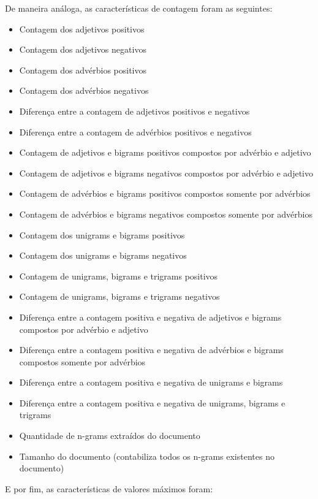 De maneira análoga, as características de contagem foram as seguintes:

\begin{itemize}
\item Contagem dos adjetivos positivos
\item Contagem dos adjetivos negativos
\item Contagem dos advérbios positivos
\item Contagem dos advérbios negativos
\item Diferença entre a contagem de adjetivos positivos e negativos
\item Diferença entre a contagem de advérbios positivos e negativos
\item Contagem de adjetivos e bigrams positivos compostos por advérbio e adjetivo
\item Contagem de adjetivos e bigrams negativos compostos por advérbio e adjetivo
\item Contagem de advérbios e bigrams positivos compostos somente por advérbios
\item Contagem de advérbios e bigrams negativos compostos somente por advérbios
\item Contagem dos unigrams e bigrams positivos
\item Contagem dos unigrams e bigrams negativos
\item Contagem de unigrams, bigrams e trigrams positivos 
\item Contagem de unigrams, bigrams e trigrams negativos
\item Diferença entre a contagem positiva e negativa de adjetivos e bigrams compostos por advérbio e adjetivo
\item Diferença entre a contagem positiva e negativa de advérbios e bigrams compostos somente por advérbios
\item Diferença entre a contagem positiva e negativa de unigrams e bigrams
\item Diferença entre a contagem positiva e negativa de unigrams, bigrams e trigrams
\item Quantidade de n-grams extraídos do documento
\item Tamanho do documento (contabiliza todos os n-grams existentes no documento)
\end{itemize}

E por fim, as características de valores máximos foram:

